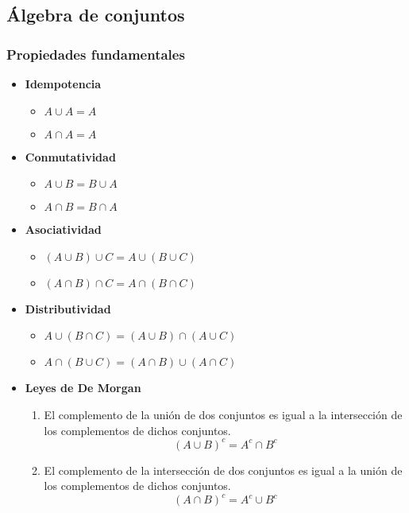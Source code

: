 \subsection{Álgebra de conjuntos} \label{sec:algebra_conjuntos}
\subsubsection{Propiedades fundamentales}

\begin{itemize}
	\item \textbf{Idempotencia}
	\begin{itemize}[itemsep=0pt]
		\item \( A \cup A = A \)
		\item \( A \cap A = A \)
	\end{itemize}
	\item \textbf{Conmutatividad}
	\begin{itemize}[itemsep=0pt]
		\item \(A \cup B = B \cup A\)
		\item \(A \cap B = B \cap A\)
	\end{itemize}
	
	\item \textbf{Asociatividad}
	\begin{itemize}[itemsep=0pt]
		\item \((A \cup B) \cup C = A \cup (B \cup C)\)
		\item \((A \cap B) \cap C = A \cap (B \cap C)\)
	\end{itemize}
	
	\item \textbf{Distributividad}
	\begin{itemize}[itemsep=0pt]
		\item \(A \cup (B \cap C) = (A \cup B) \cap (A \cup C)\)
		\item \(A \cap (B \cup C) = (A \cap B) \cup (A \cap C)\)
	\end{itemize}
		
	\item \textbf{Leyes de De Morgan}
	
	\begin{enumerate}[label={\textbf{\arabic*})}]
		\item El complemento de la unión de dos conjuntos es igual a la intersección de los complementos de dichos conjuntos.
		\[ (A \cup B)^c = A^c \cap B^c \]
		
		\item El complemento de la intersección de dos conjuntos es igual a la unión de los complementos de dichos conjuntos.
		\[ (A \cap B)^c = A^c \cup B^c \]
	\end{enumerate}
	

\end{itemize}

